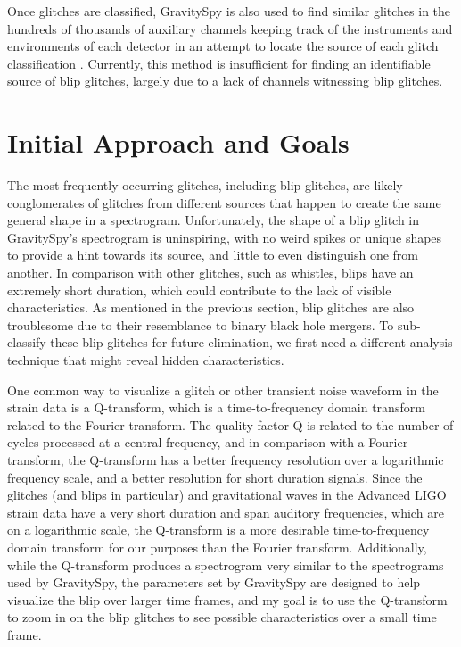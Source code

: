 \documentclass[a4paper]{article}
\begin{document}
Once glitches are classified, GravitySpy is also used to find similar glitches in the hundreds of thousands of auxiliary channels keeping track of the instruments and environments of each detector in an attempt to locate the source of each glitch classification \cite{Zevin:2016}. Currently, this method is insufficient for finding an identifiable source of blip glitches, largely due to a lack of channels witnessing blip glitches.

\section{Initial Approach and Goals} \label{goal}

The most frequently-occurring glitches, including blip glitches, are likely conglomerates of glitches from different sources that happen to create the same general shape in a spectrogram. Unfortunately, the shape of a blip glitch in GravitySpy's spectrogram is uninspiring, with no weird spikes or unique shapes to provide a hint towards its source, and little to even distinguish one from another. In comparison with other glitches, such as whistles, blips have an extremely short duration, which could contribute to the lack of visible characteristics. As mentioned in the previous section, blip glitches are also troublesome due to their resemblance to binary black hole mergers. To sub-classify these blip glitches for future elimination, we first need a different analysis technique that might reveal hidden characteristics. 

One common way to visualize a glitch or other transient noise waveform in the strain data is a Q-transform, which is a time-to-frequency domain transform related to the Fourier transform. The quality factor Q is related to the number of cycles processed at a central frequency, and in comparison with a Fourier transform, the Q-transform has a better frequency resolution over a logarithmic frequency scale, and a better resolution for short duration signals. Since the glitches (and blips in particular) and gravitational waves in the Advanced LIGO strain data have a very short duration and span auditory frequencies, which are on a logarithmic scale, the Q-transform is a more desirable time-to-frequency domain transform for our purposes than the Fourier transform. Additionally, while the Q-transform produces a spectrogram very similar to the spectrograms used by GravitySpy, the parameters set by GravitySpy are designed to help visualize the blip over larger time frames, and my goal is to use the Q-transform to zoom in on the blip glitches to see possible characteristics over a small time frame.
\end{document}
